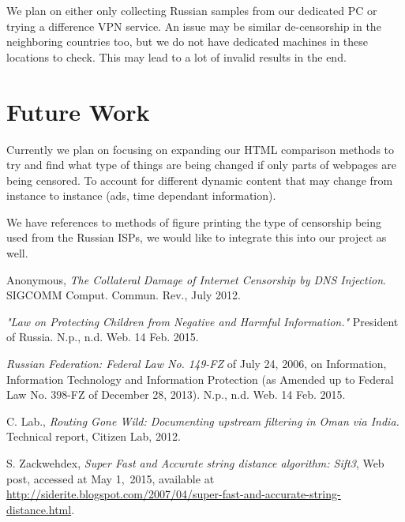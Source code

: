 \documentclass[conference]{IEEEtran}
\begin{document}
We plan on either only collecting Russian samples from our dedicated PC or trying a difference VPN service. 
An issue may be similar de-censorship in the neighboring countries too, but we do not have dedicated machines in these locations to check. 
This may lead to a lot of invalid results in the end. 

\section{Future Work}

Currently we plan on focusing on expanding our HTML comparison methods to try and find what type of things are being changed if only parts of webpages are being censored.
To account for different dynamic content that may change from instance to instance (ads, time dependant information).

We have references to methods of figure printing the type of censorship being used from the Russian ISPs, we would like to integrate this into our project as well. 
\begin{thebibliography}{9}


  Anonymous,
  \emph{The Collateral Damage of Internet Censorship by DNS Injection}.
  SIGCOMM Comput. Commun. Rev., July 2012.
  
    \emph{"Law on Protecting Children from Negative and Harmful Information."} President of Russia. N.p., n.d. Web. 14 Feb. 2015. 
    
    \emph{Russian Federation: Federal Law No. 149-FZ} of July 24, 2006, on Information, Information Technology and Information Protection (as Amended up to Federal Law No. 398-FZ of December 28, 2013). N.p., n.d. Web. 14 Feb. 2015.
    
C. Lab., 
    \emph{Routing Gone Wild: Documenting upstream filtering in Oman via India.} Technical report, Citizen Lab, 2012. 


 S. Zackwehdex, \emph{Super Fast and Accurate string distance algorithm: Sift3}, Web post, accessed at May 1,\ 2015, available at \\ \url{http://siderite.blogspot.com/2007/04/super-fast-and-accurate-string-distance.html}.

\end{thebibliography}
\end{document}
